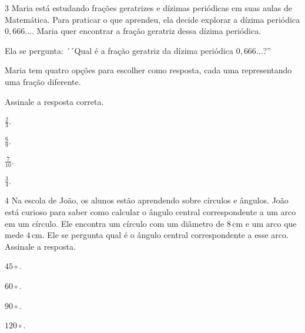 \num{3} Maria está estudando frações geratrizes e dízimas periódicas em suas
aulas de Matemática. Para praticar o que aprendeu, ela decide explorar a
dízima periódica $0,666\ldots$. Maria quer encontrar a fração geratriz dessa
dízima periódica.

Ela se pergunta: ´´Qual é a fração geratriz da dízima periódica $0,666\ldots$?''

Maria tem quatro opções para escolher como resposta, cada uma representando uma fração diferente.

Assinale a resposta correta.

\begin{escolha}
\item $\frac{2}{3}$.
\item $\frac{6}{9}$.
\item $\frac{7}{10}$.
\item $\frac{3}{4}$.
\end{escolha}



\num{4} Na escola de João, os alunos estão aprendendo sobre círculos e
ângulos. João está curioso para saber como calcular o ângulo central
correspondente a um arco em um círculo. Ele encontra um círculo com um
diâmetro de $8\,\text{cm}$ e um arco que mede $4\,\text{cm}$. Ele se
pergunta qual é o ângulo central correspondente a esse arco. Assinale
a resposta.

\begin{escolha}
\item $45\circ$.

\item $60\circ$.

\item $90\circ$.

\item $120\circ$.
\end{escolha}

